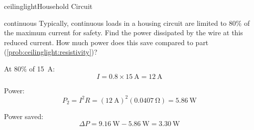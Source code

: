 \begin{mainquestion}{ceilinglight}{Household Circuit}
\begin{partquestion}{continuous}
{Typically, continuous loads in a housing circuit are limited to $80\%$ of the maximum current for safety. Find the power dissipated by the wire at this reduced current. How much power does this save compared to part (\cref{prob:ceilinglight:resistivity})?}

\begin{answer}
At $80\%$ of \qty{15}{\ampere}:
\[
I = 0.8 \times \qty{15}{\ampere} = \qty{12}{\ampere}
\]

Power:
\[
P_2 = I^2 R = (\qty{12}{\ampere})^2 (\qty{0.0407}{\ohm}) = \qty{5.86}{\watt}
\]

Power saved:
\[
\Delta P = \qty{9.16}{\watt} - \qty{5.86}{\watt} = \qty{3.30}{\watt}
\]

\end{answer}
\end{partquestion}

\end{mainquestion}
